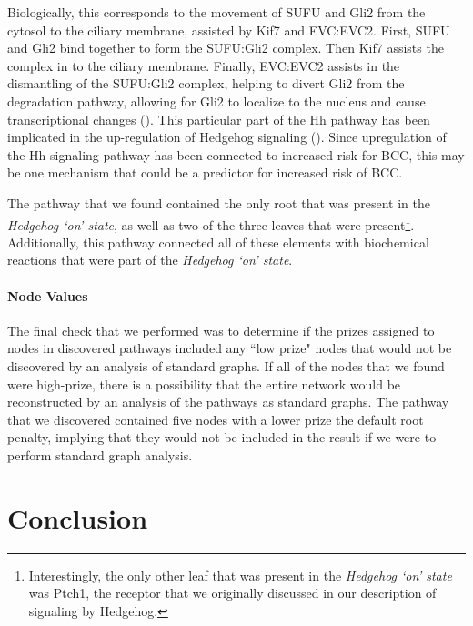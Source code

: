 \documentclass[12pt,twoside]{reedthesis}
\theoremstyle{definition}
\begin{document}
    Biologically, this corresponds to the movement of SUFU and Gli2 from the cytosol to the ciliary membrane, assisted by Kif7 and EVC:EVC2. First, SUFU and Gli2 bind together to form the SUFU:Gli2 complex. Then Kif7 assists the complex in to the ciliary membrane. Finally, EVC:EVC2 assists in the dismantling of the SUFU:Gli2 complex, helping to divert Gli2 from the degradation pathway, allowing for Gli2 to localize to the nucleus and cause transcriptional changes (\cite{Humke2010}). This particular part of the Hh pathway has been implicated in the up-regulation of Hedgehog signaling (\cite{Tukachinsky2010}). Since upregulation of the Hh signaling pathway has been connected to increased risk for BCC, this may be one mechanism that could be a predictor for increased risk of BCC.\par

    The pathway that we found contained the only root that was present in the \textit{Hedgehog `on' state}, as well as two of the three leaves that were present\footnote{Interestingly, the only other leaf that was present in the \textit{Hedgehog `on' state} was Ptch1, the receptor that we originally discussed in our description of signaling by Hedgehog.}. Additionally, this pathway connected all of these elements with biochemical reactions that were part of the \textit{Hedgehog `on' state}.\par

   \subsubsection{Node Values}

   The final check that we performed was to determine if the prizes assigned to nodes in discovered pathways included any ``low prize" nodes that would not be discovered by an analysis of standard graphs. If all of the nodes that we found were high-prize, there is a possibility that the entire network would be reconstructed by an analysis of the pathways as standard graphs. The pathway that we discovered contained five nodes with a lower prize the default root penalty, implying that they would not be included in the result if we were to perform standard graph analysis.

\chapter*{Conclusion}
	\setcounter{chapter}{5}
	\setcounter{section}{0}
\end{document}
